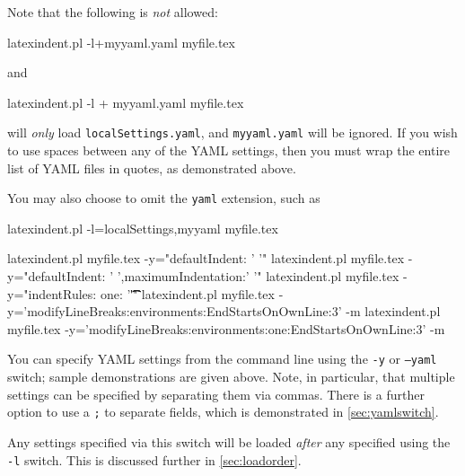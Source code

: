 \documentclass[10pt]{article}
\newcommand{\flagbox}[1]{%
 \par
 \makebox[30pt][l]{%
  \hspace{-1cm}%
  \ttfamily\fontseries{b}\selectfont #1
 }%
}
\begin{document}
 Note that the following is \emph{not} allowed:

 \begin{commandshell}
latexindent.pl -l+myyaml.yaml myfile.tex
\end{commandshell}

 and

 \begin{commandshell}
latexindent.pl -l + myyaml.yaml myfile.tex
\end{commandshell}

 will \emph{only} load \texttt{localSettings.yaml}, and \texttt{myyaml.yaml} will be
 ignored. If you wish to use spaces between any of the YAML settings, then you must wrap
 the entire list of YAML files in quotes, as demonstrated above.

 You may also choose to omit the \texttt{yaml} extension, such as

 \begin{commandshell}
latexindent.pl -l=localSettings,myyaml myfile.tex
\end{commandshell}

\flagbox{-y, --yaml=yaml settings}

 \begin{commandshell}
latexindent.pl myfile.tex -y="defaultIndent: ' '"
latexindent.pl myfile.tex -y="defaultIndent: ' ',maximumIndentation:' '"
latexindent.pl myfile.tex -y="indentRules: one: '\t\t\t\t'"
latexindent.pl myfile.tex -y='modifyLineBreaks:environments:EndStartsOnOwnLine:3' -m
latexindent.pl myfile.tex -y='modifyLineBreaks:environments:one:EndStartsOnOwnLine:3' -m
\end{commandshell}

 \label{page:yamlswitch}You%
  can specify YAML settings from the command line
 using the \texttt{-y} or \texttt{--yaml} switch; sample demonstrations are given above.
 Note, in particular, that multiple settings can be specified by separating them via
 commas. There is a further option to use a \texttt{;} to separate fields, which is
 demonstrated in \vref{sec:yamlswitch}.

 Any settings specified via this switch will be loaded \emph{after} any specified using
 the \texttt{-l} switch. This is discussed further in \vref{sec:loadorder}. \flagbox{-d,
 --onlydefault} 
\end{document}
